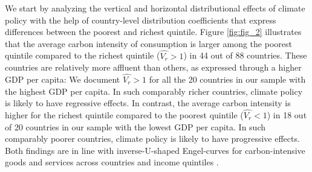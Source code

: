 \documentclass[12pt, a4paper]{article}
\begin{document}
We start by analyzing the vertical and horizontal distributional effects of climate policy with the help of country-level distribution coefficients that express differences between the poorest and richest quintile. Figure \ref{fig:fig_2} illustrates that the average carbon intensity of consumption is larger among the poorest quintile compared to the richest quintile ($\widehat{V_{r}}>1$) in 44 out of 88 countries. These countries are relatively more affluent than others, as expressed through a higher GDP per capita: We document $\widehat{V_{r}}>1$ for all the 20 countries in our sample with the highest GDP per capita. In such comparably richer countries, climate policy is likely to have regressive effects. In contrast, the average carbon intensity is higher for the richest quintile compared to the poorest quintile ($\widehat{V_{r}}<1$) in 18 out of 20 countries in our sample with the lowest GDP per capita. In such comparably poorer countries, climate policy is likely to have progressive effects. Both findings are in line with inverse-U-shaped Engel-curves for carbon-intensive goods and services across countries and income quintiles \autocite{Dorband.2019}. 
\end{document}
